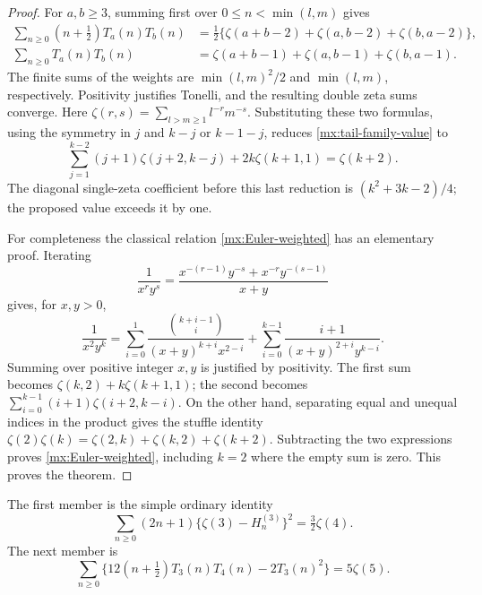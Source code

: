 \begin{proof}
For $a,b\ge3$, summing first over $0\le n<\min(l,m)$ gives
\begin{align}
 \sum_{n\ge0}(n+\tfrac12)T_a(n)T_b(n)
 &=\tfrac12\{\zeta(a+b-2)+\zeta(a,b-2)+\zeta(b,a-2)\},
 \label{mx:weighted-tail}\\
 \sum_{n\ge0}T_a(n)T_b(n)
 &=\zeta(a+b-1)+\zeta(a,b-1)+\zeta(b,a-1).
 \label{mx:ordinary-tail}
\end{align}
The finite sums of the weights are $\min(l,m)^2/2$ and $\min(l,m)$,
respectively. Positivity justifies Tonelli, and the resulting double
zeta sums converge. Here $\zeta(r,s)=\sum_{l>m\ge1}l^{-r}m^{-s}$.
Substituting these two formulas, using the symmetry in $j$ and $k-j$
or $k-1-j$, reduces \eqref{mx:tail-family-value} to
\begin{equation}\label{mx:Euler-weighted}
 \sum_{j=1}^{k-2}(j+1)\zeta(j+2,k-j)
          +2k\zeta(k+1,1)=\zeta(k+2).
\end{equation}
The diagonal single-zeta coefficient before this last reduction is
$(k^2+3k-2)/4$; the proposed value exceeds it by one.

For completeness the classical relation \eqref{mx:Euler-weighted}
has an elementary proof. Iterating
\[
 \frac1{x^r y^s}=
 \frac{x^{-(r-1)}y^{-s}+x^{-r}y^{-(s-1)}}{x+y}
\]
gives, for $x,y>0$,
\begin{equation}\label{mx:partial-fraction}
 \frac1{x^2y^k}
 =\sum_{i=0}^{1}\frac{\binom{k+i-1}{i}}{(x+y)^{k+i}x^{2-i}}
  +\sum_{i=0}^{k-1}\frac{i+1}{(x+y)^{2+i}y^{k-i}}.
\end{equation}
Summing over positive integer $x,y$ is justified by positivity. The
first sum becomes $\zeta(k,2)+k\zeta(k+1,1)$; the second becomes
$\sum_{i=0}^{k-1}(i+1)\zeta(i+2,k-i)$.
On the other hand, separating equal and unequal indices in the product
gives the stuffle identity
$\zeta(2)\zeta(k)=\zeta(2,k)+\zeta(k,2)+\zeta(k+2)$.
Subtracting the two expressions proves \eqref{mx:Euler-weighted},
including $k=2$ where the empty sum is zero. This proves the theorem.
\end{proof}
The first member is the simple ordinary identity
\begin{equation}\label{mx:tail-three-square}
 \boxed{\sum_{n\ge0}(2n+1)\{\zeta(3)-H_n^{(3)}\}^2
                         =\tfrac32\zeta(4).}
\end{equation}
The next member is
\[
 \sum_{n\ge0}\{12(n+\tfrac12)T_3(n)T_4(n)-2T_3(n)^2\}
                         =5\zeta(5).
\]

